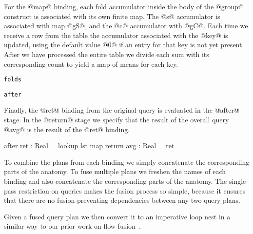 For the @map@ binding, each fold accumulator inside the body of the @group@ construct is associated with its own finite map. The @s@ accumulator is associated with map @gS@, and the @c@ accumulator with @gC@. Each time we receive a row from the table the accumulator associated with the @key@ is updated, using the default value @0@ if an entry for that key is not yet present. After we have processed the entire table we divide each sum with its corresponding count to yield a map of means for each key.
\begin{alltt}
  folds  

  after  
\end{alltt}


Finally, the @ret@ binding from the original query is evaluated in the @after@ stage. In the @return@ stage we specify that the result of the overall query @avg@ is the result of the @ret@ binding.
\begin{code}
  after  { ret : Real = lookup lst map }
  return { avg : Real = ret }
\end{code}


To combine the plans from each binding we simply concatenate the corresponding parts of the anatomy. To fuse multiple plans we freshen the names of each binding and also concatenate the corresponding parts of the anatomy. The single-pass restriction on queries makes the fusion process so simple, because it ensures that there are no fusion-preventing dependencies between any two query plans. 

Given a fused query plan we then convert it to an imperative loop nest in a similar way to our prior work on flow fusion~\cite{lippmeier2013data}.

